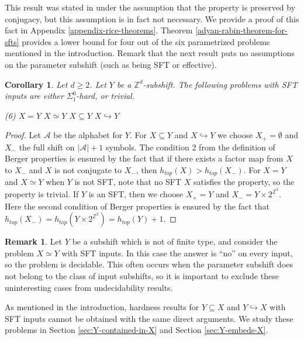 \documentclass[a4paper]{article}
\newcommand{\Z}{\mathbb{Z}}
\newcommand{\A}{\mathcal{A}}
\newtheorem{corollary}[theorem]{Corollary}
\theoremstyle{definition}
\newtheorem{remark}[theorem]{Remark}
\begin{document}
This result was stated in \cite{carrasco-vargas_rice_2025} under the assumption that the property is preserved by conjugacy, but this assumption is in fact not necessary. We provide a proof of this fact in Appendix \ref{appendix-rice-theorems}. Theorem \ref{adyan-rabin-theorem-for-sfts} provides a lower bound for four out of the six parametrized problems mentioned in the introduction. Remark that the next result puts no assumptions on the parameter subshift (such as being SFT or effective). 
\begin{corollary}\label{prop:some-berger-properties}
    Let $d\geq 2$. Let $Y$ be a  $\Z^d$-subshift. The following problems with SFT inputs are either $\Sigma_1^0$-hard, or trivial.
    \begin{tasks}[style=itemize](6)
        \task $X=Y$
        \task $X\simeq Y$
        \task $X\subseteq Y$
        \task $X\hookrightarrow Y$
    \end{tasks}
\end{corollary}
    \begin{proof}
    Let $\A$ be the alphabet for $Y$. For $X\subseteq Y$ and $X\hookrightarrow Y$ we choose  $X_+ = \emptyset$ and $X_-$ the full shift on $|\A|+1$ symbols. The condition 2 from the definition of Berger properties is ensured by the fact that if there exists a factor map from $X$ to $X_-$ and $X$ is not conjugate to $X_-$, then $h_{top}(X)>h_{top}(X_-)$. For $X=Y$ and $X\simeq Y$ when $Y$ is not SFT, note that no SFT $X$ satisfies the property, so the property is trivial. If $Y$ is an SFT, then we choose $X_{+}=Y$ and $X_-=Y \times 2^{\Z^2}$. Here the second condition of Berger properties is ensured by the fact that $h_{top}(X_-)=h_{top}(Y \times 2^{\Z^2})=h_{top}(Y)+1$.
\end{proof}
\begin{remark}
Let $Y$ be a subshift which is not of finite type, and consider the problem $X\simeq Y$ with SFT inputs. In this case the answer is ``no'' on every input, so the problem is decidable. This often occurs when the parameter subshift does not belong to the class of input subshifts, so it is important to exclude these uninteresting cases from undecidability results. 
\end{remark}

As mentioned in the introduction, hardness results for $Y\subseteq X$ and $Y\hookrightarrow X$ with SFT inputs cannot be obtained with the same direct arguments. We study these problems in Section \ref{sec:Y-contained-in-X} and Section \ref{sec:Y-embeds-X}.
\end{document}
